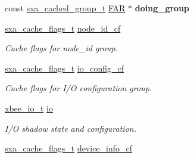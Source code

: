 \begin{DoxyCompactItemize}
\item 
\hypertarget{structsxa__node__t_ab2dff3a5f503f07dec32ae1e59c85898}{const \hyperlink{structsxa__cached__group__t}{sxa\-\_\-cached\-\_\-group\-\_\-t} \hyperlink{group__hal_gaef060b3456fdcc093a7210a762d5f2ed}{F\-A\-R} $\ast$ {\bfseries doing\-\_\-group}}\label{structsxa__node__t_ab2dff3a5f503f07dec32ae1e59c85898}

\item 
\hypertarget{structsxa__node__t_ac2acdbe4009c4fc763c6ac93bc0056eb}{\hyperlink{group___s_x_a_ga21b45e50d83fcc1363c4239313e88c06}{sxa\-\_\-cache\-\_\-flags\-\_\-t} \hyperlink{structsxa__node__t_ac2acdbe4009c4fc763c6ac93bc0056eb}{node\-\_\-id\-\_\-cf}}\label{structsxa__node__t_ac2acdbe4009c4fc763c6ac93bc0056eb}

\begin{DoxyCompactList}\small\item\em Cache flags for node\-\_\-id group. \end{DoxyCompactList}\item 
\hypertarget{structsxa__node__t_a8b839f7ad17e883aa9ef2532b2be929a}{\hyperlink{group___s_x_a_ga21b45e50d83fcc1363c4239313e88c06}{sxa\-\_\-cache\-\_\-flags\-\_\-t} \hyperlink{structsxa__node__t_a8b839f7ad17e883aa9ef2532b2be929a}{io\-\_\-config\-\_\-cf}}\label{structsxa__node__t_a8b839f7ad17e883aa9ef2532b2be929a}

\begin{DoxyCompactList}\small\item\em Cache flags for I/\-O configuration group. \end{DoxyCompactList}\item 
\hyperlink{structxbee__io__t}{xbee\-\_\-io\-\_\-t} \hyperlink{structsxa__node__t_a87711fd12194e90fe58291cf2ea6e30f}{io}
\begin{DoxyCompactList}\small\item\em I/\-O shadow state and configuration. \end{DoxyCompactList}\item 
\hypertarget{structsxa__node__t_a02af329d146957380b2ca7ffaae5bd83}{\hyperlink{group___s_x_a_ga21b45e50d83fcc1363c4239313e88c06}{sxa\-\_\-cache\-\_\-flags\-\_\-t} \hyperlink{structsxa__node__t_a02af329d146957380b2ca7ffaae5bd83}{device\-\_\-info\-\_\-cf}}\label{structsxa__node__t_a02af329d146957380b2ca7ffaae5bd83}


\end{DoxyCompactItemize}
